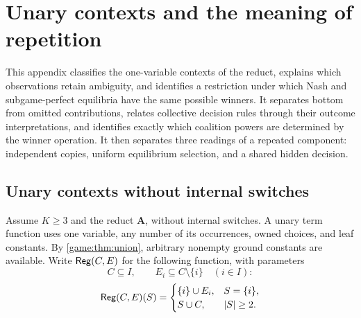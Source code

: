 \section{Unary contexts and the meaning of repetition}\label{app:contexts}
This appendix classifies the one-variable contexts of the reduct, explains which observations retain ambiguity, and identifies a restriction under which Nash and subgame-perfect equilibria have the same possible winners. It separates bottom from omitted contributions, relates collective decision rules through their outcome interpretations, and identifies exactly which coalition powers are determined by the winner operation. It then separates three readings of a repeated component: independent copies, uniform equilibrium selection, and a shared hidden decision.

\subsection{Unary contexts without internal switches}

Assume $K\geq3$ and the reduct $\mathbf A$, without internal switches.
A unary term function uses one variable, any number of
its occurrences, owned choices, and leaf constants. By
\cref{game:thm:union}, arbitrary nonempty ground constants are available.
Write $\mathsf{Reg}(C,E)$ for the following function, with parameters
\[
 C\subseteq I,\qquad E_i\subseteq C\setminus\{i\}\quad(i\in I):
\]
\begin{equation}\label{game:eq:normal}
 \mathsf{Reg}(C,E)(S)=
 \begin{cases}
 \{i\}\cup E_i,&S=\{i\},\\
 S\cup C,&|S|\geq2.
 \end{cases}
\end{equation}

